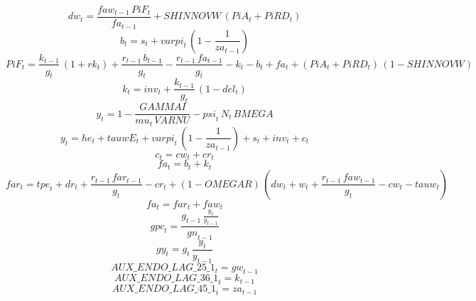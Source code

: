 \begin{dmath}
{dw}_{t}=\frac{{faw}_{t-1}\, {PiF}_{t}}{{fa}_{t-1}}+{SHINNOVW}\, \left({PiA}_{t}+{PiRD}_{t}\right)
\end{dmath}
\begin{dmath}
{b}_{t}={s}_{t}+{varpi}_{t}\, \left(1-\frac{1}{{za}_{t-1}}\right)
\end{dmath}
\begin{dmath}
{PiF}_{t}=\frac{{k}_{t-1}}{{g}_{t}}\, \left(1+{rk}_{t}\right)+\frac{{r}_{t-1}\, {b}_{t-1}}{{g}_{t}}-\frac{{r}_{t-1}\, {fa}_{t-1}}{{g}_{t}}-{k}_{t}-{b}_{t}+{fa}_{t}+\left({PiA}_{t}+{PiRD}_{t}\right)\, \left(1-{SHINNOVW}\right)
\end{dmath}
\begin{dmath}
{k}_{t}={inv}_{t}+\frac{{k}_{t-1}}{{g}_{t}}\, \left(1-{del}_{t}\right)
\end{dmath}
\begin{dmath}
{y}_{t}=1-\frac{{GAMMAI}}{{mu}_{t}\, {VARNU}}-{psi}_{t}\, {N}_{t}\, {BMEGA}
\end{dmath}
\begin{dmath}
{y}_{t}={he}_{t}+{tauwE}_{t}+{varpi}_{t}\, \left(1-\frac{1}{{za}_{t-1}}\right)+{s}_{t}+{inv}_{t}+{c}_{t}
\end{dmath}
\begin{dmath}
{c}_{t}={cw}_{t}+{cr}_{t}
\end{dmath}
\begin{dmath}
{fa}_{t}={b}_{t}+{k}_{t}
\end{dmath}
\begin{dmath}
{far}_{t}={tpe}_{t}+{dr}_{t}+\frac{{r}_{t-1}\, {far}_{t-1}}{{g}_{t}}-{cr}_{t}+\left(1-{OMEGAR}\right)\, \left({dw}_{t}+{w}_{t}+\frac{{r}_{t-1}\, {faw}_{t-1}}{{g}_{t}}-{cw}_{t}-{tauw}_{t}\right)
\end{dmath}
\begin{dmath}
{fa}_{t}={far}_{t}+{faw}_{t}
\end{dmath}
\begin{dmath}
{gpc}_{t}=\frac{{g}_{t-1}\, \frac{{y}_{t}}{{y}_{t-1}}}{{gn}_{t-1}}
\end{dmath}
\begin{dmath}
{gy}_{t}={g}_{t}\, \frac{{y}_{t}}{{y}_{t-1}}
\end{dmath}
\begin{dmath}
{AUX\_ENDO\_LAG\_25\_1}_{t}={gw}_{t-1}
\end{dmath}
\begin{dmath}
{AUX\_ENDO\_LAG\_36\_1}_{t}={k}_{t-1}
\end{dmath}
\begin{dmath}
{AUX\_ENDO\_LAG\_45\_1}_{t}={za}_{t-1}
\end{dmath}
